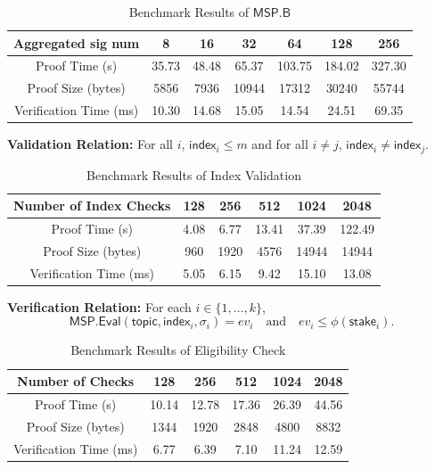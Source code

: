 \documentclass{article}
\begin{document}
\begin{table}[htbp]
\centering
\caption{Benchmark Results of $\mathsf{MSP.B}$}
\renewcommand{\arraystretch}{0.9}
\setlength{\tabcolsep}{10pt}
\begin{tabular}{c|c|c|c|c|c|c} \toprule
    \textbf{Aggregated sig num} & \textbf{8} & \textbf{16} & \textbf{32} & \textbf{64} & \textbf{128} & \textbf{256} \\ \midrule
    Proof Time (s) & 35.73 & 48.48 & 65.37 & 103.75 & 184.02 & 327.30 \\ 
    Proof Size (bytes) & 5856 & 7936 & 10944 & 17312 & 30240 & 55744 \\ 
    Verification Time (ms) & 10.30 & 14.68 & 15.05 & 14.54 & 24.51 & 69.35 \\ \bottomrule
\end{tabular}
\label{tab:mspb_benchmark}
\end{table}


\newpage

\textbf{Validation Relation:} For all $i$, $\mathsf{index}_i \leq m$ and for all $i \neq j$, $\mathsf{index}_i \neq \mathsf{index}_j$.



\begin{table}[htbp]
\centering
\caption{Benchmark Results of Index Validation}
\renewcommand{\arraystretch}{0.9}
\setlength{\tabcolsep}{10pt}
\begin{tabular}{c|c|c|c|c|c} \toprule
    \textbf{Number of Index Checks} & \textbf{128} & \textbf{256} & \textbf{512} & \textbf{1024} & \textbf{2048}  \\ \midrule
    Proof Time (s) & 4.08 & 6.77 & 13.41 & 37.39 & 122.49  \\ 
    Proof Size (bytes) & 960 & 1920 & 4576 & 14944 & 14944  \\ 
    Verification Time (ms) & 5.05 & 6.15 & 9.42 & 15.10 & 13.08  \\ \bottomrule
\end{tabular}
\label{tab:index_check_benchmark}
\end{table}



\textbf{Verification Relation:} For each $i \in \{1, \dots, k\}$,
\[ \mathsf{MSP.Eval}(\mathsf{topic}, \mathsf{index}_i, \sigma_i) = ev_i \quad \text{and} \quad ev_i \leq \phi(\mathsf{stake}_i). \]


\begin{table}[htbp]
\centering
\caption{Benchmark Results of Eligibility Check}
\renewcommand{\arraystretch}{0.9}
\setlength{\tabcolsep}{10pt}
\begin{tabular}{c|c|c|c|c|c} \toprule
    \textbf{Number of Checks} & \textbf{128} & \textbf{256} & \textbf{512} & \textbf{1024} & \textbf{2048}  \\ \midrule
    Proof Time (s) & 10.14 & 12.78 & 17.36 & 26.39 & 44.56 \\ 
    Proof Size (bytes) & 1344 & 1920 & 2848 & 4800 & 8832 \\ 
    Verification Time (ms) & 6.77 & 6.39 & 7.10 & 11.24 & 12.59 \\ \bottomrule
\end{tabular}
\label{tab:eligibility_check_benchmark}
\end{table}
\end{document}
